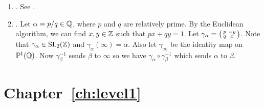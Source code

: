 \begin{enumerate}
\item {}.
See \cite[Lemma~1.2.2]{diamond-shurman}.

\item {}.
   Let $\alpha = p/q \in \mathbb{Q}$,
  where $p$ and $q$ are relatively prime. By the Euclidean
  algorithm, we can find $x, y \in \mathbb{Z}$ such that $px + qy = 1$. Let
  $\gamma_\alpha = \left( \begin{smallmatrix}p&-y\\q&x\end{smallmatrix}\right)$. Note that $\gamma_\alpha \in
  \operatorname{SL}_2(\mathbb{Z})$ and $\gamma_{\alpha}(\infty) = \alpha$. Also let
  $\gamma_\infty$ be the identity map on ${\mathbb P}^1(\mathbb{Q})$. Now
  $\gamma_\beta^{-1}$ sends $\beta$ to $\infty$ so we have
  $\gamma_\alpha \circ \gamma_\beta^{-1}$ which sends $\alpha$ to
  $\beta$.

\end{enumerate}

\section{Chapter~\ref{ch:level1}}

